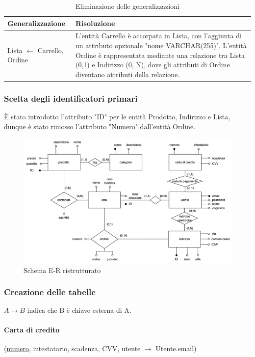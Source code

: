 \documentclass[11pt]{article}
\begin{document}
\begin{table}[H]
	\centering
	\begin{tabularx}{\textwidth}{|l|X|}
		\hline
		\textbf{Generalizzazione} & \textbf{Risoluzione} \\
		\hline
		Lista $\leftarrow$ Carrello, Ordine & L'entità Carrello è accorpata in
		Lista, con l'aggiunta di un attributo opzionale "nome VARCHAR(255)".
		L'entità Ordine è rappresentata mediante una relazione tra Lista (0,1) e
		Indirizzo (0, N), dove gli attributi di Ordine diventano attributi della
		relazione. \\
		\hline
	\end{tabularx}
	\caption{Eliminazione delle generalizzazioni}
\end{table}

\subsubsection{Scelta degli identificatori primari}
È stato introdotto l'attributo "ID" per le entità Prodotto, Indirizzo e Lista, 
dunque è stato rimosso l'attributo "Numero" dall'entità Ordine.


\begin{figure}[H]
	\centering
	\includegraphics[width=\textwidth]{schema_logico}
	\caption{Schema E-R ristrutturato}
\end{figure}

\subsubsection{Creazione delle tabelle}
$A \rightarrow B$ indica che B è chiave esterna di A.

\paragraph{Carta di credito}(\underline{numero}, intestatario, scadenza,
CVV, utente $\rightarrow$ Utente.email)
\end{document}
